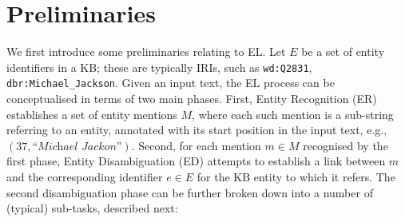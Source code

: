 \documentclass{llncs}
\begin{document}


\section{Preliminaries}
\label{subsect:preliminaries}

We first introduce some preliminaries relating to EL. Let $E$ be a set of entity identifiers in a KB; these are typically IRIs, such as \texttt{wd:Q2831}, \texttt{dbr:Michael\_Jackson}. Given an input text, the EL process can be conceptualised in terms of two main phases. First, Entity Recognition (ER) establishes a set of entity mentions $M$, where each such mention is a sub-string referring to an entity, annotated with its start position in the input text, e.g., $(37,\textit{``Michael Jackon''})$. Second, for each mention $m\in{}M$ recognised by the first phase, Entity Disambiguation (ED) attempts to establish a link between $m$ and the corresponding identifier $e\in{}E$ for the KB entity to which it refers. The second disambiguation phase can be further broken down into a number of (typical) sub-tasks, described next:
\end{document}
